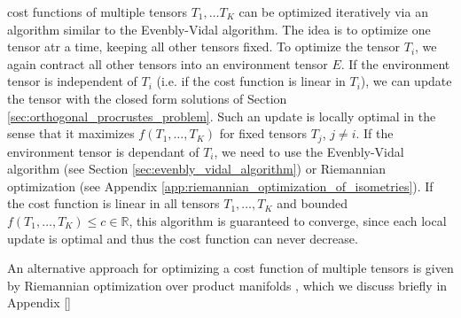 cost functions of multiple tensors $T_1, \dots T_K$ can be optimized iteratively via an algorithm similar to the Evenbly-Vidal algorithm. The idea is to optimize one tensor atr a time, keeping all other tensors fixed. To optimize the tensor $T_i$, we again contract all other tensors into an environment tensor $E$. If the environment tensor is independent of $T_i$ (i.e. if the cost function is linear in $T_i$), we can update the tensor with the closed form solutions of Section \ref{sec:orthogonal_procrustes_problem}. Such an update is locally optimal in the sense that it maximizes $f(T_1, \dots, T_K)$ for fixed tensors $T_j$, $j\neq i$. If the environment tensor is dependant of $T_i$, we need to use the Evenbly-Vidal algorithm (see Section \ref{sec:evenbly_vidal_algorithm}) or Riemannian optimization (see Appendix \ref{app:riemannian_optimization_of_isometries}). If the cost function is linear in all tensors $T_1, \dots, T_K$ and bounded $f(T_1, \dots, T_K) \le c\in\mathbb{R}$, this algorithm is guaranteed to converge, since each local update is optimal and thus the cost function can never decrease. \par
An alternative approach for optimizing a cost function of multiple tensors is given by Riemannian optimization over product manifolds \cite{cite:riemannian_optimization_isometric_tensor_networks}, which we discuss briefly in Appendix \ref{} 